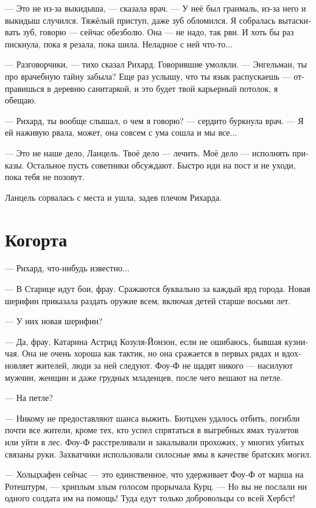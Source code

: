 \documentclass[a4paper,12pt,fleqn]{book}\usepackage{cooltooltips}\usepackage{polyglossia}\setdefaultlanguage[babelshorthands=true]{russian}\setotherlanguage{english}\defaultfontfeatures{Ligatures=TeX,Mapping=tex-text} \usepackage{xcolor}\definecolor{lightgray}{HTML}{bbbbbb}\color{lightgray}\newcommand{\ml}[3]{\textenglish{\textcolor{black}{#3}}}
\begin{document}
--- Это не из-за выкидыша, --- сказала врач.
--- У неё был гранмаль, из-за него и выкидыш случился.
Тяжёлый приступ, даже зуб обломился.
Я собралась вытаскивать зуб, говорю --- сейчас обезболю.
Она --- не надо, так рви.
И хоть бы раз пискнула, пока я резала, пока шила.
Неладное с ней что-то...

--- Разговорчики, --- тихо сказал Рихард.
Говорившие умолкли.
--- Энгельман, ты про врачебную тайну забыла?
Еще раз услышу, что ты язык распускаешь --- отправишься в деревню санитаркой, и это будет твой карьерный потолок, я обещаю.

--- Рихард, ты вообще слышал, о чем я говорю? --- сердито буркнула врач.
--- Я ей наживую рвала, может, она совсем с ума сошла и мы все...

--- Это не наше дело, Ланцель.
Твоё дело --- лечить.
Моё дело --- исполнять приказы.
Остальное пусть советники обсуждают.
Быстро иди на пост и не уходи, пока тебя не позовут.

Ланцель сорвалась с места и ушла, задев плечом Рихарда.

\section{Когорта}

--- Рихард, что-нибудь известно...

--- В Старице идут бои, фрау.
Сражаются буквально за каждый ярд города.
Новая шерифин приказала раздать оружие всем, включая детей старше восьми лет.

--- У них новая шерифин?

--- Да, фрау, Катарина Астрид Козуля-Йонзон, если не ошибаюсь, бывшая кузничая.
Она не очень хороша как тактик, но она сражается в первых рядах и вдохновляет жителей, люди за ней следуют.
Фоу-Ф не щадят никого --- насилуют мужчин, женщин и даже грудных младенцев, после чего вешают на петле.

--- На петле?

--- Никому не предоставляют шанса выжить.
Бютцхен удалось отбить, погибли почти все жители, кроме тех, кто успел спрятаться в выгребных ямах туалетов или уйти в лес. %
Фоу-Ф расстреливали и закалывали прохожих, у многих убитых связаны руки.
Захватчики использовали силосные ямы в качестве братских могил.

--- Хольцхафен сейчас --- это единственное, что удерживает Фоу-Ф от марша на Ротештурм, --- хриплым злым голосом прорычала Курц.
--- Но вы не послали ни одного солдата им на помощь!
Туда едут только добровольцы со всей Хербст!
\end{document}
